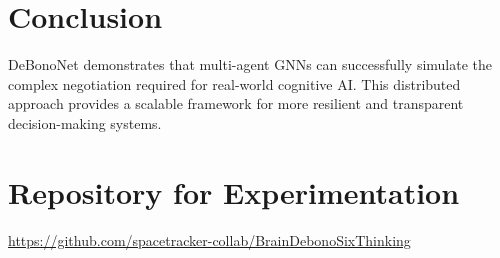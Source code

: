\documentclass[12pt]{article}
\begin{document}
\section{Conclusion}
DeBonoNet demonstrates that multi-agent GNNs can successfully simulate the complex negotiation required for real-world cognitive AI. This distributed approach provides a scalable framework for more resilient and transparent decision-making systems.

\section{Repository for Experimentation}
\noindent
\url{https://github.com/spacetracker-collab/BrainDebonoSixThinking}
\end{document}
